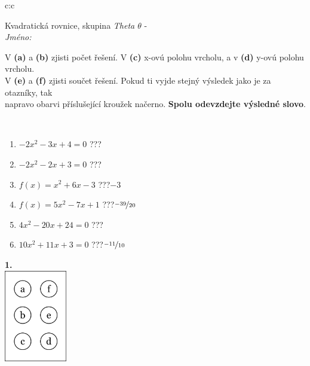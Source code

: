 \documentclass[10pt]{report}
\begin{document}
\begin{tabular}{c:c}
\begin{minipage}[c][104.5mm][t]{0.5\linewidth}
\begin{center}
\vspace{7mm}
{\huge Kvadratická rovnice, skupina \textit{Theta $\theta$} -}\\[5mm]
\textit{Jméno:}\phantom{xxxxxxxxxxxxxxxxxxxxxxxxxxxxxxxxxxxxxxxxxxxxxxxxxxxxxxxxxxxxxxxxx}\\[5mm]
\begin{minipage}{0.95\linewidth}
\begin{center}
V \textbf{(a)} a \textbf{(b)} zjisti počet řešení. V \textbf{(c)} x-ovú polohu vrcholu, a v \textbf{(d)} y-ovú polohu vrcholu.\\V \textbf{(e)} a \textbf{(f)} zjisti součet řešení. Pokud ti vyjde stejný výsledek jako je za otazníky, tak\\napravo obarvi příslušející kroužek načerno. \textbf{Spolu odevzdejte výsledné slovo}.
\end{center}
\end{minipage}
\\[1mm]
\begin{minipage}{0.79\linewidth}
\begin{center}
\begin{varwidth}{\linewidth}
\begin{enumerate}
\Large
\item $-2x^2-3x+4=0$\quad \dotfill\; ???\;\dotfill {}
\item $-2x^2-2x+3=0$\quad \dotfill\; ???\;\dotfill {}
\item $f(x)=x^2+6x-3$\quad \dotfill\; ???\;\dotfill \quad $-3$
\item $f(x)=5x^2-7x+1$\quad \dotfill\; ???\;\dotfill \quad $\nicefrac{-39}{20}$
\item $4x^2-20x+24=0$\quad \dotfill\; ???\;\dotfill {}
\item $10x^2+11x+3=0$\quad \dotfill\; ???\;\dotfill \quad $\nicefrac{-11}{10}$
\end{enumerate}
\end{varwidth}
\end{center}
\end{minipage}
\begin{minipage}{0.20\linewidth}
\begin{center}
{\Huge\bfseries 1.} \\[2mm]
\includegraphics[height=40mm]{../images/braille.png}

\end{center}
\end{minipage}
\end{center}
\end{minipage}
\end{tabular}
\end{document}
